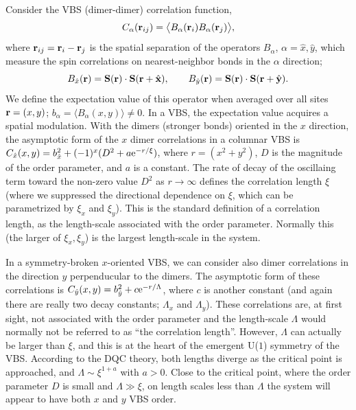 \documentclass[range]{ar2e}
\begin{document}
Consider the VBS (dimer-dimer) correlation function,
\begin{equation}
C_{\alpha} ({\bf r}_{ij}) = \bigl \langle B_\alpha({\bf r}_i)B_\alpha({\bf r}_j) \bigr \rangle, 
\label{cddef}
\end{equation}
where ${\bf r}_{ij}={\bf r}_{i}-{\bf r}_{j}$ is the spatial separation of the operators $B_\alpha$, $\alpha=\hat x,\hat y$,
which measure the spin correlations on nearest-neighbor bonds in the $\alpha$ direction;
\begin{equation}
B_{\hat x}({\bf r})={\bf S}({\bf r}) \cdot {\bf S}({\bf r}+\hat {\bf x}),~~~~~~B_{\hat y}({\bf r})={\bf S}({\bf r}) \cdot {\bf S}({\bf r}+\hat {\bf y}).
\label{bxdef}
\end{equation}
We define the expectation value of this operator when averaged over all sites ${\bf r}=(x,y)$; $b_\alpha=\langle B_{\alpha}(x,y)\rangle \not = 0$. In a VBS, the 
expectation value acquires a spatial modulation. With the dimers (stronger bonds) oriented in the $x$ direction, the asymptotic form of the $x$ dimer correlations 
in a columnar VBS is $C_{\hat x}(x,y) = b_{\hat x}^2+(-1)^{x}(D^2+a{\rm e}^{-r/\xi})$, where $r=(x^2+y^2)$, $D$ is the magnitude of the order parameter, and $a$ 
is a constant. The rate of decay of the oscillaing term toward the non-zero value $D^2$ as $r\to \infty$ defines the correlation length $\xi$ (where we suppressed 
the directional dependence on $\xi$, which can be parametrized by $\xi_x$ and $\xi_y$). This is the standard definition of a correlation length, as the 
length-scale associated with the order parameter. Normally this (the larger of $\xi_x,\xi_y$) is the largest length-scale in the system. 

In a symmetry-broken $x$-oriented VBS, we can consider also dimer correlations in the direction $y$ perpenducular to the dimers. The asymptotic form of these 
correlations is $C_{\hat y}(x,y) = b_{\hat y}^2 + c{\rm e}^{-r/\Lambda}$, where $c$ is another constant (and again there are really two decay constants; $\Lambda_x$ and
$\Lambda_y$). These correlations are, at first sight, not associated with the order parameter and the length-scale $\Lambda$ would normally not be referred to 
as ``the correlation length''. However, $\Lambda$ can actually be larger than $\xi$, and this is at the heart of the emergent U($1$) symmetry of the VBS. 
According to the DQC theory, both lengths diverge as the critical point is approached, and $\Lambda \sim \xi^{1+a}$ with $a>0$. Close to the critical point, 
where the order parameter $D$ is small and $\Lambda \gg \xi$, on length scales less than $\Lambda$ the system will appear to have both $x$ and $y$ VBS order.
\end{document}
